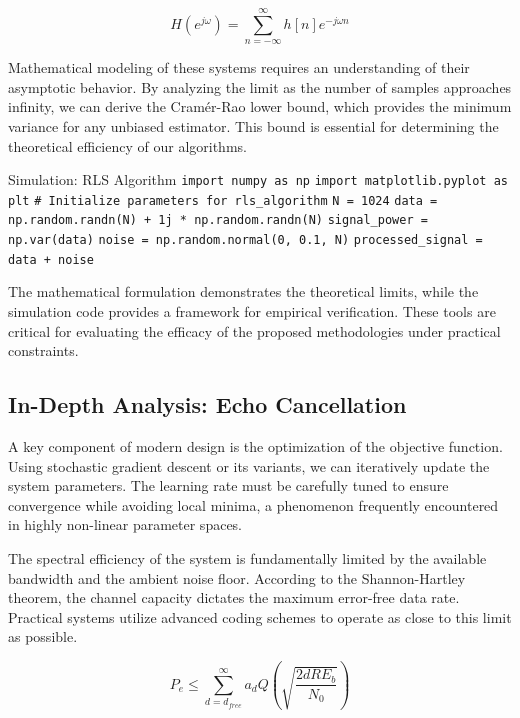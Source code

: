 \begin{equation}
    H(e^{j\omega}) = \sum_{n=-\infty}^{\infty} h[n] e^{-j\omega n}
\end{equation}

Mathematical modeling of these systems requires an understanding of their asymptotic behavior. By analyzing the limit as the number of samples approaches infinity, we can derive the Cramér-Rao lower bound, which provides the minimum variance for any unbiased estimator. This bound is essential for determining the theoretical efficiency of our algorithms.

\begin{pythonbox}{Simulation: RLS Algorithm}
\texttt{import numpy as np}
\texttt{import matplotlib.pyplot as plt}
\texttt{}
\texttt{\# Initialize parameters for rls\_algorithm}
\texttt{N = 1024}
\texttt{data = np.random.randn(N) + 1j * np.random.randn(N)}
\texttt{signal\_power = np.var(data)}
\texttt{noise = np.random.normal(0, 0.1, N)}
\texttt{processed\_signal = data + noise}
\end{pythonbox}

\vspace{0.5cm}
The mathematical formulation demonstrates the theoretical limits, while the simulation code provides a framework for empirical verification. These tools are critical for evaluating the efficacy of the proposed methodologies under practical constraints.


\subsection{In-Depth Analysis: Echo Cancellation}
A key component of modern design is the optimization of the objective function. Using stochastic gradient descent or its variants, we can iteratively update the system parameters. The learning rate must be carefully tuned to ensure convergence while avoiding local minima, a phenomenon frequently encountered in highly non-linear parameter spaces.

The spectral efficiency of the system is fundamentally limited by the available bandwidth and the ambient noise floor. According to the Shannon-Hartley theorem, the channel capacity dictates the maximum error-free data rate. Practical systems utilize advanced coding schemes to operate as close to this limit as possible.

\begin{equation}
    P_e \leq \sum_{d=d_{free}}^{\infty} a_d Q\left(\sqrt{\frac{2 d R E_b}{N_0}}\right)
\end{equation}

